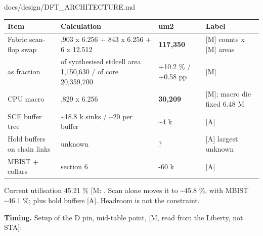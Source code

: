 \begin{relocated}{docs/design/DFT_ARCHITECTURE.md}
{{
\begin{longtable}[]{@{}
  >{\raggedright\arraybackslash}p{}
  >{\raggedright\arraybackslash}p{}
  >{\raggedright\arraybackslash}p{}
  >{\raggedright\arraybackslash}p{}@{}}
\toprule\noalign{}
\begin{minipage}[b]{\linewidth}\raggedright
Item
\end{minipage} & \begin{minipage}[b]{\linewidth}\raggedright
Calculation
\end{minipage} & \begin{minipage}[b]{\linewidth}\raggedright
um2
\end{minipage} & \begin{minipage}[b]{\linewidth}\raggedright
Label
\end{minipage} \\
\midrule\noalign{}
\endhead
\bottomrule\noalign{}
\endlastfoot
Fabric scan-flop swap & 17,903 x 6.256 + 843 x 6.256 + 6 x 12.512 &
\textbf{117,350} & {[}M{]} counts x {[}M{]} areas \\
as fraction & of synthesised stdcell area 1,150,630 / of core 20,359,700
& +10.2 \% / +0.58 pp & {[}M{]} \\
CPU macro & 4,829 x 6.256 & \textbf{30,209} & {[}M{]}; macro die fixed
6.48 M \\
SCE buffer tree & \textasciitilde18.8 k sinks / \textasciitilde20 per
buffer & \textasciitilde4 k & {[}A{]} \\
Hold buffers on chain links & unknown & ? & {[}A{]} largest unknown \\
MBIST + collars & section 6 & 45-60 k & {[}A{]} \\
\end{longtable}
}

}

Current utilisation 45.21 \% {[}M:
\code{design__instance__utilization}{]}. Scan alone moves it to
\textasciitilde45.8 \%, with MBIST \textasciitilde46.1 \%; plus hold
buffers {[}A{]}. Headroom is not the constraint.

\textbf{Timing.} Setup of the D pin, mid-table point,
 {[}M, read from the Liberty, not STA{]}:


\end{relocated}
